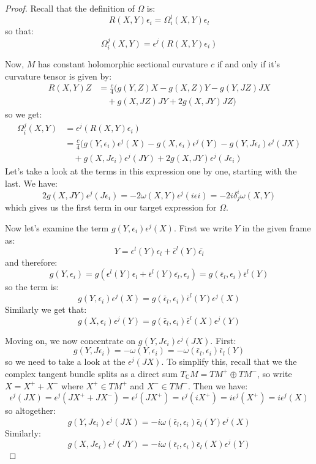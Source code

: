 \documentclass[11pt]{amsart}
\theoremstyle{definition}
\def \C{ \mathbb{C} }
\begin{document}
\begin{proof}
Recall that the definition of $\Omega$ is:
%
$$ R(X,Y) \epsilon_i = \Omega^l_i (X,Y) \epsilon_l $$
%
so that:
%
$$ \Omega^j_i (X,Y) = \epsilon^j ( R(X,Y) \epsilon_i ) $$

Now, $M$ has constant holomorphic sectional curvature $c$ if and only if it's curvature tensor is given by:
%
\begin{align*}
R(X,Y)Z &= \frac{c}{4} (g(Y,Z)X - g(X,Z)Y - g(Y,JZ)JX  \\
& \quad + g(X, JZ)JY + 2 g(X,JY)JZ )
\end{align*}
%
so we get:
%
\begin{align*}
\Omega^j_i (X,Y) &= \epsilon^j ( R(X,Y) \epsilon_i ) \\
&= \frac{c}{4} (g(Y, \epsilon_i ) \epsilon^j(X) - g(X, \epsilon_i ) \epsilon^j(Y) - g(Y,J \epsilon_i ) \epsilon^j (JX)  \\
& \quad + g(X, J \epsilon_i ) \epsilon^j (JY) + 2 g(X,JY)\epsilon^j( J \epsilon_i )
\end{align*}
%
Let's take a look at the terms in this expression one by one, starting with the last.  We have:
%
$$ 2 g(X,JY)\epsilon^j( J \epsilon_i )= - 2 \omega( X, Y ) \epsilon^j ( i \epsilon i ) = - 2 i \delta^i_j \omega( X, Y ) $$
%
which gives us the first term in our target expression for $\Omega$.  

Now let's examine the term $g( Y, \epsilon_i ) \epsilon^j(X)$.  First we write $Y$ in the given frame as:
%
$$ Y = \epsilon^l (Y) \epsilon_l + \bar{ \epsilon }^l (Y) \bar{ \epsilon_l } $$
%
and therefore:
%
$$ g( Y, \epsilon_i ) = g( \epsilon^l (Y) \epsilon_l + \bar{ \epsilon }^l (Y) \bar{ \epsilon_l }, \epsilon_i ) = g( \bar{ \epsilon }_l, \epsilon_i ) \bar{ \epsilon }^l (Y) $$
%
so the term is:
%
$$ g( Y, \epsilon_i ) \epsilon^j(X) = g( \bar{ \epsilon }_l, \epsilon_i ) \bar{ \epsilon }^l (Y) \epsilon^j(X) $$
%
Similarly we get that:
%
$$ g(X, \epsilon_i ) \epsilon^j(Y) = g( \bar{\epsilon}_l, \epsilon_i ) \bar{ \epsilon }^l (X) \epsilon^j (Y) $$

Moving on, we now concentrate on $g(Y,J \epsilon_i ) \epsilon^j (JX)$.  First:
%
$$ g(Y,J \epsilon_i ) = - \omega( Y, \epsilon_i ) = - \omega( \bar{ \epsilon }_l, \epsilon_i ) \bar{ \epsilon }_l (Y) $$
%
so we need to take a look at the $\epsilon^j (JX)$.  To simplify this, recall that we the complex tangent bundle splits as a direct sum $T_{\C} M = TM^{+} \oplus TM^{-}$, so write $X = X^{+} + X^{-}$ where $X^{+} \in TM^{+}$ and $X^{-} \in TM^{-}$.  Then we have:
%
$$ \epsilon^j (JX) = \epsilon^j ( JX^{+} + JX^{-} ) = \epsilon^j( JX^{+} ) = \epsilon^j( i X^{+} ) = i \epsilon^j ( X^{+} ) = i \epsilon^j (X) $$
%
so altogether:
%
$$ g(Y,J \epsilon_i ) \epsilon^j (JX) = - i \omega( \bar{ \epsilon }_l, \epsilon_i ) \bar{ \epsilon }_l (Y) \epsilon^j (X) $$
%
Similarly:
%
$$ g(X, J \epsilon_i ) \epsilon^j (JY) = - i \omega( \bar{ \epsilon }_l, \epsilon_i ) \bar{ \epsilon }_l (X) \epsilon^j (Y) $$


\end{proof}
\end{document}
